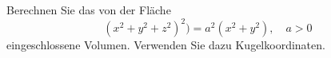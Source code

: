 \begin{atiTask}[
  title = Volumenberechnung,
]
 Berechnen Sie das von der Fläche
 \begin{equation*}
(x^2+y^2+z^2)^2)=a^2(x^2+y^2), \quad a>0
 \end{equation*}
eingeschlossene Volumen. Verwenden Sie dazu Kugelkoordinaten.

\end{atiTask}